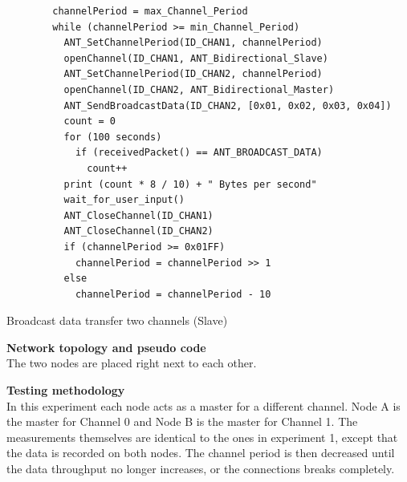 \begin{description}
	\begin{code}[H]
		\begin{verbatim}
		channelPeriod = max_Channel_Period
		while (channelPeriod >= min_Channel_Period)
		  ANT_SetChannelPeriod(ID_CHAN1, channelPeriod)
		  openChannel(ID_CHAN1, ANT_Bidirectional_Slave)
		  ANT_SetChannelPeriod(ID_CHAN2, channelPeriod)
		  openChannel(ID_CHAN2, ANT_Bidirectional_Master)
		  ANT_SendBroadcastData(ID_CHAN2, [0x01, 0x02, 0x03, 0x04])
		  count = 0
		  for (100 seconds) 
		    if (receivedPacket() == ANT_BROADCAST_DATA)
		      count++			
		  print (count * 8 / 10) + " Bytes per second"
		  wait_for_user_input()
		  ANT_CloseChannel(ID_CHAN1)
		  ANT_CloseChannel(ID_CHAN2)
		  if (channelPeriod >= 0x01FF)
		    channelPeriod = channelPeriod >> 1
		  else
		    channelPeriod = channelPeriod - 10
		\end{verbatim}
		\caption{Broadcast data transfer two channels (Slave)}\label{lst:mExp2}
	\end{code}
	
	\item{\textbf{Network topology and pseudo code}} \hfill \\ The two nodes are placed right next to each other.
	
	\item{\textbf{Testing methodology}} \hfill \\ In this experiment each node acts as a master for a different channel. Node A is the master for Channel 0 and Node B is the master for Channel 1. The measurements themselves are identical to the ones in experiment 1, except that the data is recorded on both nodes. The channel period is then decreased until the data throughput no longer increases, or the connections breaks completely.
	

\end{description}
